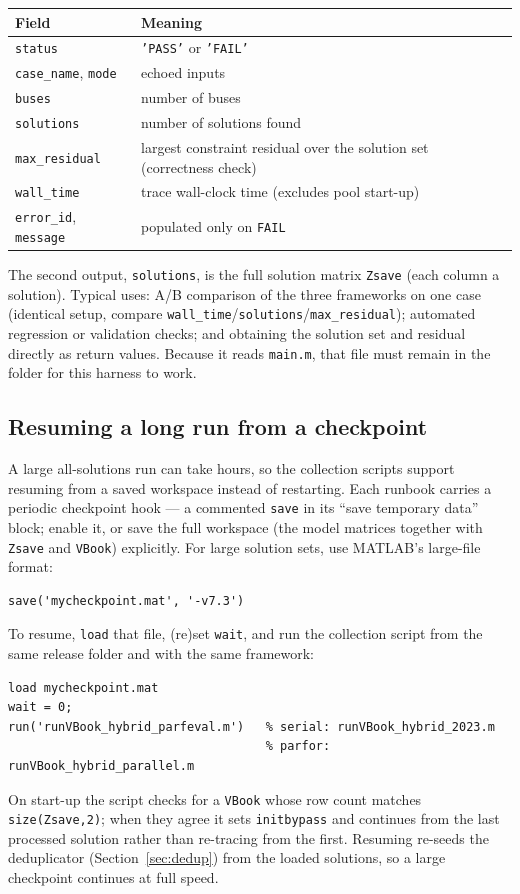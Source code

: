 \documentclass[11pt,a4paper]{article}
\newcommand{\code}[1]{\texttt{#1}}
\begin{document}
\begin{center}\small
\begin{tabular}{@{}ll@{}}
\toprule
Field & Meaning\\
\midrule
\code{status} & \code{'PASS'} or \code{'FAIL'}\\
\code{case_name}, \code{mode} & echoed inputs\\
\code{buses} & number of buses\\
\code{solutions} & number of solutions found\\
\code{max_residual} & largest constraint residual over the solution set (correctness check)\\
\code{wall_time} & trace wall-clock time (excludes pool start-up)\\
\code{error_id}, \code{message} & populated only on \code{FAIL}\\
\bottomrule
\end{tabular}
\end{center}
The second output, \code{solutions}, is the full solution matrix \code{Zsave} (each column
a solution). Typical uses: A/B comparison of the three frameworks on one case (identical
setup, compare \code{wall_time}/\code{solutions}/\code{max_residual}); automated
regression or validation checks; and obtaining the solution set and residual directly as
return values. Because it reads \code{main.m}, that file must remain in the folder for
this harness to work.

\subsection{Resuming a long run from a checkpoint}\label{sec:resume}
A large all-solutions run can take hours, so the collection scripts support resuming from a
saved workspace instead of restarting. Each runbook carries a periodic checkpoint hook --- a
commented \code{save} in its ``save temporary data'' block; enable it, or save the full
workspace (the model matrices together with \code{Zsave} and \code{VBook}) explicitly. For
large solution sets, use MATLAB's large-file format:
\begin{lstlisting}[style=mat]
save('mycheckpoint.mat', '-v7.3')
\end{lstlisting}

To resume, \code{load} that file, (re)set \code{wait}, and run the collection script from the
same release folder and with the same framework:
\begin{lstlisting}[style=mat]
load mycheckpoint.mat
wait = 0;
run('runVBook_hybrid_parfeval.m')   % serial: runVBook_hybrid_2023.m
                                    % parfor: runVBook_hybrid_parallel.m
\end{lstlisting}
On start-up the script checks for a \code{VBook} whose row count matches
\code{size(Zsave,2)}; when they agree it sets \code{initbypass} and continues from the last
processed solution rather than re-tracing from the first. Resuming re-seeds the deduplicator
(Section~\ref{sec:dedup}) from the loaded solutions, so a large checkpoint continues at full
speed.
\end{document}
